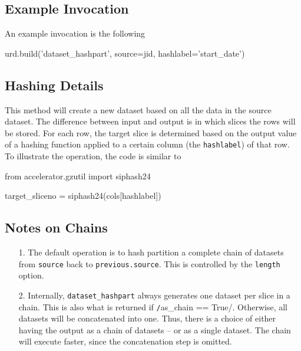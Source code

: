 \subsection{Example Invocation}
An example invocation is the following
\begin{python}
urd.build('dataset_hashpart', source=jid, hashlabel='start_date')
\end{python}


\subsection{Hashing Details}
This method will create a new dataset based on all the data in the
source dataset.  The difference between input and output is in which
slices the rows will be stored.  For each row, the target slice is
determined based on the output value of a hashing function applied to
a certain column (the \texttt{hashlabel}) of that row.  To illustrate
the operation, the code is similar to
\begin{python}
from accelerator.gzutil import siphash24

target_sliceno = siphash24(cols[hashlabel]) %
\end{python}


\subsection{Notes on Chains}
\begin{enumerate}
  \item[1.]  The default operation is to hash partition a complete
    chain of datasets from \texttt{source} back to
    \texttt{previous.source}.  This is controlled by the
    \texttt{length} option.

  \item[2.]  Internally, \texttt{dataset\_hashpart} always
    generates one dataset per slice in a chain.  This is also what is
    returned if \texttt/as_chain == True/.  Otherwise, all
    datasets will be concatenated into one.  Thus, there is a choice
    of either having the output as a chain of datasets -- or as a
    single dataset.  The chain will execute faster, since the
    concatenation step is omitted.
\end{enumerate}


